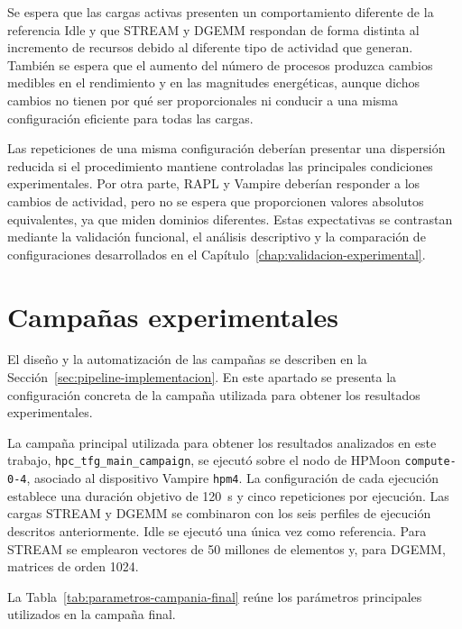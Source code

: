 Se espera que las cargas activas presenten un comportamiento diferente de la referencia Idle y que STREAM y DGEMM respondan de forma distinta al incremento de recursos debido al diferente tipo de actividad que generan. También se espera que el aumento del número de procesos produzca cambios medibles en el rendimiento y en las magnitudes energéticas, aunque dichos cambios no tienen por qué ser proporcionales ni conducir a una misma configuración eficiente para todas las cargas.

Las repeticiones de una misma configuración deberían presentar una dispersión reducida si el procedimiento mantiene controladas las principales condiciones experimentales. Por otra parte, RAPL y Vampire deberían responder a los cambios de actividad, pero no se espera que proporcionen valores absolutos equivalentes, ya que miden dominios diferentes. Estas expectativas se contrastan mediante la validación funcional, el análisis descriptivo y la comparación de configuraciones desarrollados en el Capítulo~\ref{chap:validacion-experimental}.

\section{Campañas experimentales}
\label{sec:campanas-diseno-experimental}

El diseño y la automatización de las campañas se describen en la Sección~\ref{sec:pipeline-implementacion}. En este apartado se presenta la configuración concreta de la campaña utilizada para obtener los resultados experimentales.

La campaña principal utilizada para obtener los resultados analizados en este trabajo, \texttt{hpc\_tfg\_main\_campaign}, se ejecutó sobre el nodo de HPMoon \texttt{compute-0-4}, asociado al dispositivo Vampire \texttt{hpm4}. La configuración de cada ejecución establece una duración objetivo de 120~s y cinco repeticiones por ejecución. Las cargas STREAM y DGEMM se combinaron con los seis perfiles de ejecución descritos anteriormente. Idle se ejecutó una única vez como referencia. Para STREAM se emplearon vectores de 50 millones de elementos y, para DGEMM, matrices de orden 1024. 

La Tabla~\ref{tab:parametros-campania-final} reúne los parámetros principales utilizados en la campaña final.

\begin{table}[htbp]
\centering
\caption{Parámetros de la campaña experimental final.}
\label{tab:parametros-campania-final}
\resizebox{\textwidth}{!}{}
\end{table}

